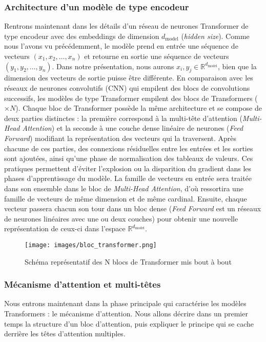 \documentclass[12pt]{article}
\theoremstyle{definition}
\begin{document}
\subsubsection{Architecture d'un modèle de type encodeur}
Rentrons maintenant dans les détails d'un réseau de neurones Transformer de type encodeur avec des embeddings de dimension \(d_{\text{model}}\) (\textit{hidden size}). Comme nous l'avons vu précédemment, le modèle prend en entrée une séquence de vecteurs \((x_1, x_2, \dots, x_n)\) et retourne en sortie une séquence de vecteurs \((y_1, y_2, \dots, y_n)\). Dans notre présentation, nous aurons \(x_i, y_j \in \mathbb{R}^{d_{\text{model}}}\), bien que la dimension des vecteurs de sortie puisse être différente. En comparaison avec les réseaux de neurones convolutifs (CNN) qui empilent des blocs de convolutions successifs, les modèles de type Transformer empilent des blocs de Transformers (\(\times N\)). Chaque bloc de Transformer possède la même architecture et se compose de deux parties distinctes : la première correspond à la multi-tête d'attention (\textit{Multi-Head Attention}) et la seconde à une couche dense linéaire de neurones (\textit{Feed Forward}) modifiant la représentation des vecteurs qui la traversent. Après chacune de ces parties, des connexions résiduelles entre les entrées et les sorties sont ajoutées, ainsi qu'une phase de normalisation des tableaux de valeurs. Ces pratiques permettent d'éviter l'explosion ou la disparition du gradient dans les phases d'apprentissage du modèle. La famille de vecteurs en entrée sera traitée dans son ensemble dans le bloc de \textit{Multi-Head Attention}, d'où ressortira une famille de vecteurs de même dimension et de même cardinal. Ensuite, chaque vecteur passera chacun son tour dans un bloc dense (\textit{Feed Forward} est un réseaux de neurones linéaires avec une ou deux couches) pour obtenir une nouvelle représentation de ceux-ci dans l'espace \(\mathbb{R}^{d_{\text{model}}}\).

\begin{figure*}[!h]
	\centering
	\texttt{[image: images/bloc\_transformer.png]}
	\caption{Schéma représentatif des N blocs de Transformer mis bout à bout}
\end{figure*}

\subsubsection{Mécanisme d'attention et multi-têtes}

Nous entrons maintenant dans la phase principale qui caractérise les modèles Transformers : le mécanisme d'attention. Nous allons décrire dans un premier temps la structure d'un bloc d'attention, puis expliquer le principe qui se cache derrière les têtes d'attention multiples. 
\end{document}

